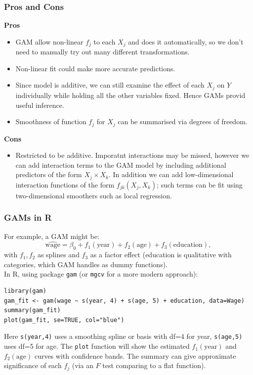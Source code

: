 \documentclass[11pt]{article}
\begin{document}
\subsubsection{Pros and Cons}
\noindent \textbf{Pros}
\begin{itemize}
    \item GAM allow non-linear $f_j$ to each $X_j$ and does it automatically, so we don't need to manually try out many different transformations.
    \item Non-linear fit could make more accurate predictions.
    \item Since model is additive, we can still examine the effect of each $X_j$ on $Y$ individually while holding all the other variables fixed. Hence GAMs provid useful inference.
    \item Smoothness of function $f_j$ for $X_j$ can be summarised via degrees of freedom.
\end{itemize} \phantom{i}

\noindent \textbf{Cons}
\begin{itemize}
    \item Restricted to be additive. Imporatnt interactions may be missed, however we can add interaction terms to the GAM model by including additional predictors of the form $X_j \times X_k$. In addition we can add low-dimensional interaction functions of the form $f_{jk}(X_j, X_k)$; such terms can be fit using two-dimensional smoothers such as local regression.
\end{itemize}

\subsubsection{GAMs in R}
\noindent For example, a GAM might be:
\[ \widehat{\text{wage}} = \beta_0 + f_1(\text{year}) + f_2(\text{age}) + f_3(\text{education}), \]
with $f_1, f_2$ as splines and $f_3$ as a factor effect (education is qualitative with categories, which GAM handles as dummy functions). \\

\noindent In R, using package \texttt{gam} (or \texttt{mgcv} for a more modern approach):
\begin{verbatim}
library(gam)
gam_fit <- gam(wage ~ s(year, 4) + s(age, 5) + education, data=Wage)
summary(gam_fit)
plot(gam_fit, se=TRUE, col="blue")
\end{verbatim}
\noindent Here \texttt{s(year,4)} uses a smoothing spline or basis with df=4 for year, \texttt{s(age,5)} uses df=5 for age. The \texttt{plot} function will show the estimated $f_1(\text{year})$ and $f_2(\text{age})$ curves with confidence bands. The summary can give approximate significance of each $f_j$ (via an $F$ test comparing to a flat function).
\end{document}
